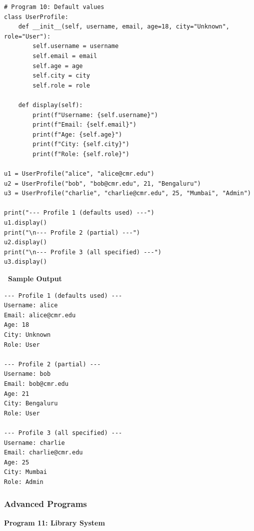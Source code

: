 \documentclass[12pt,a4paper]{article}
\newcommand{\outhead}{\noindent\colorbox{cmrgreen!25}%
  {\textbf{\small\color{cmrdark}~Sample Output~}}\par\vspace{-1pt}}
\begin{document}
\begin{lstlisting}
# Program 10: Default values
class UserProfile:
    def __init__(self, username, email, age=18, city="Unknown", role="User"):
        self.username = username
        self.email = email
        self.age = age
        self.city = city
        self.role = role

    def display(self):
        print(f"Username: {self.username}")
        print(f"Email: {self.email}")
        print(f"Age: {self.age}")
        print(f"City: {self.city}")
        print(f"Role: {self.role}")

u1 = UserProfile("alice", "alice@cmr.edu")
u2 = UserProfile("bob", "bob@cmr.edu", 21, "Bengaluru")
u3 = UserProfile("charlie", "charlie@cmr.edu", 25, "Mumbai", "Admin")

print("--- Profile 1 (defaults used) ---")
u1.display()
print("\n--- Profile 2 (partial) ---")
u2.display()
print("\n--- Profile 3 (all specified) ---")
u3.display()
\end{lstlisting}

\outhead
\begin{lstlisting}[style=outputstyle]
--- Profile 1 (defaults used) ---
Username: alice
Email: alice@cmr.edu
Age: 18
City: Unknown
Role: User

--- Profile 2 (partial) ---
Username: bob
Email: bob@cmr.edu
Age: 21
City: Bengaluru
Role: User

--- Profile 3 (all specified) ---
Username: charlie
Email: charlie@cmr.edu
Age: 25
City: Mumbai
Role: Admin
\end{lstlisting}

\subsubsection{Advanced Programs}

\textbf{Program 11: Library System}
\end{document}
